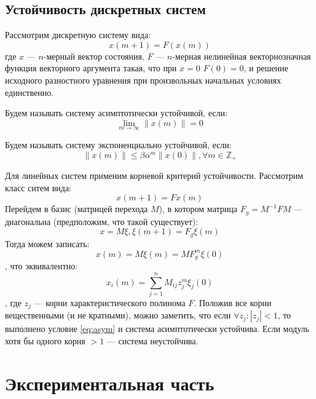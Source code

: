 \documentclass[a4paper, 14pt]{extarticle}
\theoremstyle{definition}
\theoremstyle{plain}
\theoremstyle{remark}
\begin{document}
\subsection{Устойчивость дискретных систем}
Рассмотрим дискретную систему вида:
\begin{equation}
	x(m+1) = F(x(m))
\end{equation}
где $x$ --- $n$-мерный вектор состояния, $F$ --- $n$-мерная нелинейная векторнозначная функция векторного аргумента такая, что при $x = 0$ $F (0) = 0$, и решение
исходного разностного уравнения при произвольных начальных условиях единственно.

Будем называть систему асимптотически устойчивой, если:
\begin{equation}\label{eq:asym}
	\lim\limits_{m\to\infty}\|x(m)\|=0
\end{equation}

Будем называть систему экспоненциально устойчивой, если:
\begin{equation}
	\|x(m)\|\le \beta\alpha^m\|x(0)\|, \forall m \in \mathbb{Z}_+
\end{equation}

Для линейных систем применим корневой критерий устойчивости. Рассмотрим класс ситем вида:
\begin{equation*}
	x(m+1) = Fx(m)
\end{equation*}
Перейдем в базис (матрицей перехода $M$), в котором матрица $F_g = M^{-1}FM$ --- диагональна (предположим, что такой существует):
\begin{equation}
	x = M\xi, \xi(m+1) = F_g\xi(m)
\end{equation}
Тогда можем записать:
\begin{equation*}
	x(m)=M\xi(m)=MF_g^m\xi(0)
\end{equation*}
, что эквивалентно:
\begin{equation}
	x_i(m) = \sum\limits_{j=1}^{n}M_{ij}z_j^m\xi_j(0)
\end{equation}
, где $z_j$ --- корни характеристического полинома $F$. Положив все корни вещественными (и не кратными), можно заметить, что если $\forall z_j: |z_j| < 1$, то выполнено условие \ref{eq:asym} и система асимптотически устойчива. Если модуль хотя бы одного корня $>1$ --- система неустойчива.
\section{Экспериментальная часть}
\end{document}
